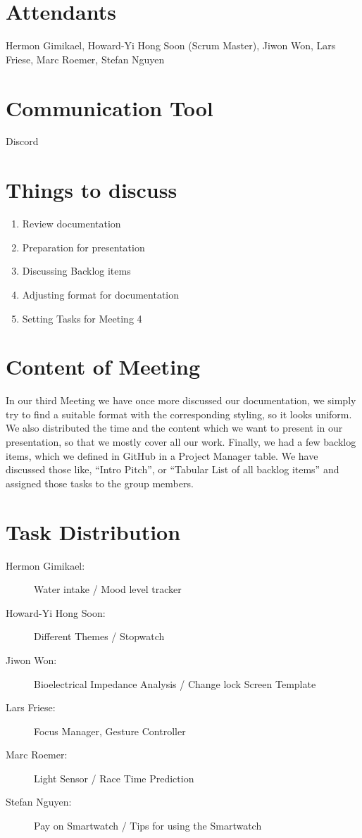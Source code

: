 \documentclass{article}
\begin{document}
\section*{Attendants}
Hermon Gimikael, Howard-Yi Hong Soon (Scrum Master), Jiwon Won, Lars Friese, Marc Roemer, Stefan Nguyen

\section*{Communication Tool}
Discord

\section*{Things to discuss}
\begin{enumerate}
    \item Review documentation
    \item Preparation for presentation
    \item Discussing Backlog items
    \item Adjusting format for documentation
    \item Setting Tasks for Meeting 4
\end{enumerate}

\section*{Content of Meeting}
In our third Meeting we have once more discussed our documentation, we simply try to find a suitable format with the corresponding styling, so it looks uniform. We also distributed the time and the content which we want to present in our presentation, so that we mostly cover all our work. Finally, we had a few backlog items, which we defined in GitHub in a Project Manager table. We have discussed those like, “Intro Pitch”, or “Tabular List of all backlog items” and assigned those tasks to the group members. 

\section*{Task Distribution}
\begin{description}
    \item[Hermon Gimikael:] Water intake / Mood level tracker 
    \item[Howard-Yi Hong Soon:] Different Themes / Stopwatch
    \item[Jiwon Won:] Bioelectrical Impedance Analysis / Change lock Screen Template
    \item[Lars Friese:] Focus Manager, Gesture Controller
    \item[Marc Roemer:] Light Sensor / Race Time Prediction 
    \item[Stefan Nguyen:] Pay on Smartwatch / Tips for using the Smartwatch
\end{description}
\end{document}
